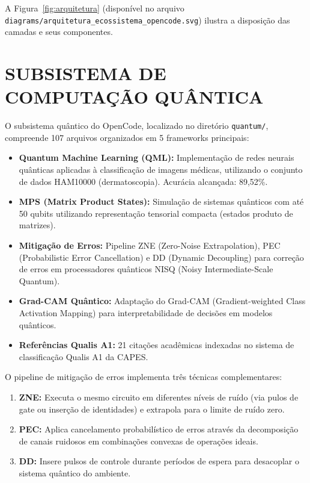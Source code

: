 \documentclass[
  brazil,
  sumario=tradicional,
  10pt
]{abntex2}
\begin{document}
A Figura~\ref{fig:arquitetura} (disponível no arquivo
\texttt{diagrams/arquitetura\_ecossistema\_opencode.svg}) ilustra a
disposição das camadas e seus componentes.

\section{SUBSISTEMA DE COMPUTAÇÃO QUÂNTICA}
\label{sec:quantum}

O subsistema quântico do OpenCode, localizado no diretório
\texttt{quantum/}, compreende 107 arquivos organizados em 5 frameworks
principais:

\begin{itemize}
  \item \textbf{Quantum Machine Learning (QML):} Implementação de
    redes neurais quânticas aplicadas à classificação de imagens
    médicas, utilizando o conjunto de dados HAM10000 (dermatoscopia).
    Acurácia alcançada: 89,52\%.
  \item \textbf{MPS (Matrix Product States):} Simulação de sistemas
    quânticos com até 50 qubits utilizando representação tensorial
    compacta (estados produto de matrizes).
  \item \textbf{Mitigação de Erros:} Pipeline ZNE (Zero-Noise
    Extrapolation), PEC (Probabilistic Error Cancellation) e DD
    (Dynamic Decoupling) para correção de erros em processadores
    quânticos NISQ (Noisy Intermediate-Scale Quantum).
  \item \textbf{Grad-CAM Quântico:} Adaptação do Grad-CAM
    (Gradient-weighted Class Activation Mapping) para interpretabilidade
    de decisões em modelos quânticos.
  \item \textbf{Referências Qualis A1:} 21 citações acadêmicas
    indexadas no sistema de classificação Qualis A1 da CAPES.
\end{itemize}

O pipeline de mitigação de erros implementa três técnicas
complementares:

\begin{enumerate}
  \item \textbf{ZNE:} Executa o mesmo circuito em diferentes níveis
    de ruído (via pulos de gate ou inserção de identidades) e
    extrapola para o limite de ruído zero.
  \item \textbf{PEC:} Aplica cancelamento probabilístico de erros
    através da decomposição de canais ruidosos em combinações
    convexas de operações ideais.
  \item \textbf{DD:} Insere pulsos de controle durante períodos de
    espera para desacoplar o sistema quântico do ambiente.
\end{enumerate}
\end{document}
